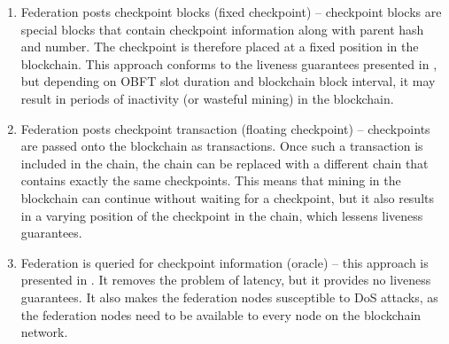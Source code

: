 \begin{enumerate}
  \item Federation posts checkpoint blocks (fixed checkpoint) -- checkpoint blocks are special blocks that contain checkpoint information along with parent hash and number. The checkpoint is therefore placed at a fixed position in the blockchain. This approach conforms to the liveness guarantees presented in \cite{chkp-paper}, but depending on OBFT slot duration and blockchain block interval, it may result in periods of inactivity (or wasteful mining) in the blockchain.
  \item Federation posts checkpoint transaction (floating checkpoint) -- checkpoints are passed onto the blockchain as transactions. Once such a transaction is included in the chain, the chain can be replaced with a different chain that contains exactly the same checkpoints. This means that mining in the blockchain can continue without waiting for a checkpoint, but it also results in a varying position of the checkpoint in the chain, which lessens liveness guarantees.
  \item Federation is queried for checkpoint information (oracle) -- this approach is presented in \cite{obft-paper}. It removes the problem of latency, but it provides no liveness guarantees. It also makes the federation nodes susceptible to DoS attacks, as the federation nodes need to be available to every node on the blockchain network.
\end{enumerate}




